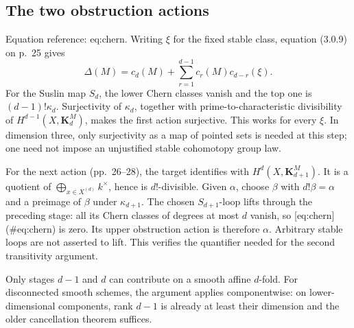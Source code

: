 \documentclass[10pt]{article}
\begin{document}
\subsection*{The two obstruction actions}
Equation reference: eq:chern. Writing \(\xi\) for the fixed stable class, equation (3.0.9) on p. 25 gives \[
 \Delta(M)=c_d(M)+\sum_{r=1}^{d-1}c_r(M)c_{d-r}(\xi).\] For the Suslin map \(S_d\), the lower Chern classes vanish and the top one is \((d-1)!\kappa_d\). Surjectivity of \(\kappa_d\), together with prime-to-characteristic divisibility of \(H^{d-1}(X,\mathbf K_d^M)\), makes the first action surjective. This works for every \(\xi\). In dimension three, only surjectivity as a map of pointed sets is needed at this step; one need not impose an unjustified stable cohomotopy group law.\par
For the next action (pp. 26–28), the target identifies with \(H^d(X,\mathbf K_{d+1}^M)\). It is a quotient of \(\bigoplus_{x\in X^{(d)}}k^\times\), hence is \(d!\)-divisible. Given \(\alpha\), choose \(\beta\) with \(d!\beta=\alpha\) and a preimage of \(\beta\) under \(\kappa_{d+1}\). The chosen \(S_{d+1}\)-loop lifts through the preceding stage: all its Chern classes of degrees at most \(d\) vanish, so [eq:chern] (\#eq:chern) is zero. Its upper obstruction action is therefore \(\alpha\). Arbitrary stable loops are not asserted to lift. This verifies the quantifier needed for the second transitivity argument.\par
Only stages \(d-1\) and \(d\) can contribute on a smooth affine \(d\)-fold. For disconnected smooth schemes, the argument applies componentwise: on lower-dimensional components, rank \(d-1\) is already at least their dimension and the older cancellation theorem suffices.\par
\end{document}
